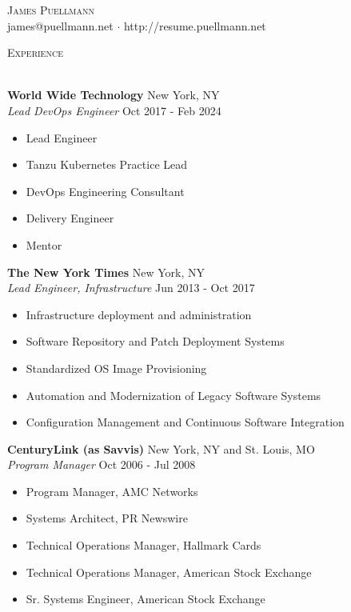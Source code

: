 \documentclass[letterpaper]{article}
\newcommand{\lineunder} {
    \vspace*{-8pt} \\
    \hspace*{-18pt} \hrulefill \\
}
\newcommand{\header} [1] {
    {\hspace*{-18pt}\vspace*{6pt} \textsc{#1}}
    \vspace*{-6pt} \lineunder
}
\begin{document}
\vspace*{-40pt}

    

\vspace*{-10pt}
\begin{center}
	{\Huge \scshape {James Puellmann}}\\
	james@puellmann.net $\cdot$ http://resume.puellmann.net\\
\end{center}

\header{Experience}
\vspace{1mm}

\textbf{World Wide Technology} \hfill New York, NY\\
\textit{Lead DevOps Engineer} \hfill Oct 2017 - Feb 2024\\
\vspace{-1mm}
\begin{itemize} \itemsep 1pt
	\item Lead Engineer
	\item Tanzu Kubernetes Practice Lead
	\item DevOps Engineering Consultant
	\item Delivery Engineer
	\item Mentor
\end{itemize}
\textbf{The New York Times} \hfill New York, NY\\
\textit{Lead Engineer, Infrastructure} \hfill Jun 2013 - Oct 2017\\
\vspace{-1mm}
\begin{itemize} \itemsep 1pt
	\item Infrastructure deployment and administration
	\item Software Repository and Patch Deployment Systems
	\item Standardized OS Image Provisioning
	\item Automation and Modernization of Legacy Software Systems
	\item Configuration Management and Continuous Software Integration
\end{itemize}
\textbf{CenturyLink (as Savvis)} \hfill New York, NY and St. Louis, MO\\
\textit{Program Manager} \hfill Oct 2006 - Jul 2008\\
\vspace{-1mm}
\begin{itemize} \itemsep 1pt
	\item Program Manager, AMC Networks
	\item Systems Architect, PR Newswire
	\item Technical Operations Manager, Hallmark Cards
	\item Technical Operations Manager, American Stock Exchange
	\item Sr. Systems Engineer, American Stock Exchange
\end{itemize}
\end{document}
